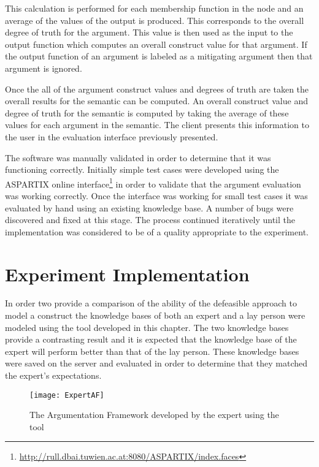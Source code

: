This calculation is performed for each membership function in the node and an average of the values of the output is produced. This corresponds to the overall degree of truth for the argument. This value is then used as the input to the output function which computes an overall construct value for that argument. If the output function of an argument is labeled as a mitigating argument then that argument is ignored.

Once the all of the argument construct values and degrees of truth are taken the overall results for the semantic can be computed. An overall construct value and degree of truth for the semantic is computed by taking the average of these values for each argument in the semantic. The client presents this information to the user in the evaluation interface previously presented.

The software was manually validated in order to determine that it was functioning correctly. Initially simple test cases were developed using the ASPARTIX online interface\footnote{\url{http://rull.dbai.tuwien.ac.at:8080/ASPARTIX/index.faces}} in order to validate that the argument evaluation was working correctly. Once the interface was working for small test cases it was evaluated by hand using an existing knowledge base. A number of bugs were discovered and fixed at this stage. The process continued iteratively until the implementation was considered to be of a quality appropriate to the experiment.


\section{Experiment Implementation}

In order two provide a comparison of the ability of the defeasible approach to model a construct the knowledge bases of both an expert and a lay person were modeled using the tool developed in this chapter. The two knowledge bases provide a contrasting result and it is expected that the knowledge base of the expert will perform better than that of the lay person. These knowledge bases were saved on the server and evaluated in order to determine that they matched the expert's expectations.

\begin{figure}[H]
\centering
\texttt{[image: ExpertAF]}
\caption{The Argumentation Framework developed by the expert using the tool}
\end{figure}


